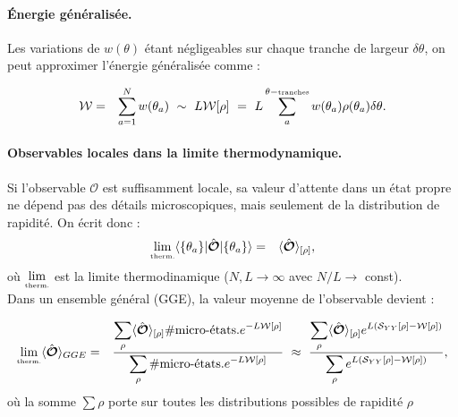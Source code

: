 \paragraph{Énergie généralisée.}	
Les variations de $w(\theta)$ étant négligeables sur chaque tranche de largeur $\delta\theta$, on peut approximer l’énergie généralisée comme :%

\begin{eqnarray}
	 \mathcal{W} & = & \sum_{a = 1}^N  w(\theta_a)	 ~ \sim ~ L\mathcal{W}[\rho] ~=~ L \sum_a^{\theta-\mbox{\tiny tranches}}	 w(\theta_a) \rho(\theta_a) \delta \theta.
\end{eqnarray}


\paragraph{Observables locales dans la limite thermodynamique.}
Si l’observable $\mathcal{O}$ est suffisamment locale, sa valeur d’attente dans un état propre ne dépend pas des détails microscopiques, mais seulement de la distribution de rapidité. On écrit donc :
\begin{eqnarray}
	\underset{\mbox{\tiny therm.}}{\lim} \langle  \{ \theta_a\}  \vert   \hat{\bm{\mathcal{O}}} \vert \{ \theta_a\} \rangle & = & \langle \hat{\bm{\mathcal{O}}}\rangle_{[\rho]},
\end{eqnarray}
où $\underset{\mbox{\tiny therm.}}{\lim}$ est la limite thermodinamique ($N,L \to \infty$ avec $N/L \to $ const).\\


Dans un ensemble général (GGE), la valeur moyenne de l’observable devient :	
	
\begin{eqnarray}
	\underset{\mbox{\tiny therm.}}{\lim} \langle \hat{\bm{\mathcal{O}}} \rangle_{GGE} & =  & \frac{  \displaystyle \sum_{\rho }  \langle \hat{\bm{\mathcal{O}}}\rangle_{[\rho]} \# \mbox{micro-états.} e^{- L\mathcal{W}[\rho]    }}{ \displaystyle \sum_{\rho }  \# \mbox{micro-états.}e^{- L\mathcal{W}[\rho] } } ~ \approx  ~ \frac{  \displaystyle \sum_{\rho }  \langle \hat{\bm{\mathcal{O}}}\rangle_{[\rho]}  e^{L(\mathcal{S}_{YY}[\rho] -  \mathcal{W}[\rho]) }}{ \displaystyle \sum_{\rho } e^{L(\mathcal{S}_{YY}[\rho] -  \mathcal{W}[\rho]) } },
\end{eqnarray}
où la somme $\sum\rho$ porte sur toutes les distributions possibles de rapidité $\rho$


